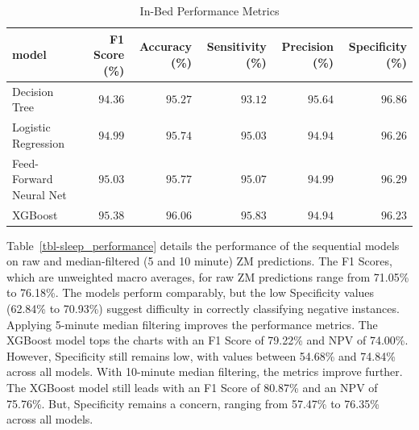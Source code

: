 \documentclass[
  super,
  preprint,
  3p]{elsarticle}
\begin{document}
\hypertarget{tbl-in_bed_performance}{}
\begin{longtable}{lrrrrr}
\caption{\label{tbl-in_bed_performance}In-Bed Performance Metrics }\tabularnewline

\toprule
model & F1 Score (\%) & Accuracy (\%) & Sensitivity (\%) & Precision (\%) & Specificity (\%) \\ 
\midrule
Decision Tree & $94.36$ & $95.27$ & $93.12$ & $95.64$ & $96.86$ \\ 
Logistic Regression & $94.99$ & $95.74$ & $95.03$ & $94.94$ & $96.26$ \\ 
Feed-Forward Neural Net & $95.03$ & $95.77$ & $95.07$ & $94.99$ & $96.29$ \\ 
XGBoost & $95.38$ & $96.06$ & $95.83$ & $94.94$ & $96.23$ \\ 
\bottomrule
\end{longtable}

Table~\ref{tbl-sleep_performance} details the performance of the
sequential models on raw and median-filtered (5 and 10 minute) ZM
predictions. The F1 Scores, which are unweighted macro averages, for raw
ZM predictions range from 71.05\% to 76.18\%. The models perform
comparably, but the low Specificity values (62.84\% to 70.93\%) suggest
difficulty in correctly classifying negative instances. Applying
5-minute median filtering improves the performance metrics. The XGBoost
model tops the charts with an F1 Score of 79.22\% and NPV of 74.00\%.
However, Specificity still remains low, with values between 54.68\% and
74.84\% across all models. With 10-minute median filtering, the metrics
improve further. The XGBoost model still leads with an F1 Score of
80.87\% and an NPV of 75.76\%. But, Specificity remains a concern,
ranging from 57.47\% to 76.35\% across all models.
\end{document}

